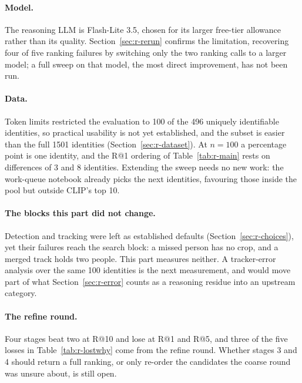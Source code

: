 \label{sec:r-limits}
\paragraph{Model.} The reasoning LLM is Flash-Lite 3.5, chosen for its larger
free-tier allowance rather than its quality. Section~\ref{sec:r-rerun} confirms
the limitation, recovering four of five ranking failures by switching only the two
ranking calls to a larger model; a full sweep on that model, the most direct
improvement, has not been run.

\paragraph{Data.} Token limits restricted the evaluation to 100 of the 496
uniquely identifiable identities, so practical usability is not yet established,
and the subset is easier than the full 1501 identities
(Section~\ref{sec:r-dataset}). At $n=100$ a percentage point is one identity, and
the R@1 ordering of Table~\ref{tab:r-main} rests on differences of 3 and 8
identities. Extending the sweep needs no new work: the work-queue notebook already
picks the next identities, favouring those inside the pool but outside CLIP's top 10.

\paragraph{The blocks this part did not change.} Detection and tracking were left
as established defaults (Section~\ref{sec:r-choices}), yet their failures reach the
search block: a missed person has no crop, and a merged track holds two people.
This part measures neither. A tracker-error analysis over the same 100 identities
is the next measurement, and would move part of what Section~\ref{sec:r-error}
counts as a reasoning residue into an upstream category.

\paragraph{The refine round.} Four stages beat two at R@10 and lose at R@1 and R@5,
and three of the five losses in Table~\ref{tab:r-lostwhy} come from the refine
round. Whether stages 3 and 4 should return a full ranking, or only re-order the
candidates the coarse round was unsure about, is still open.


